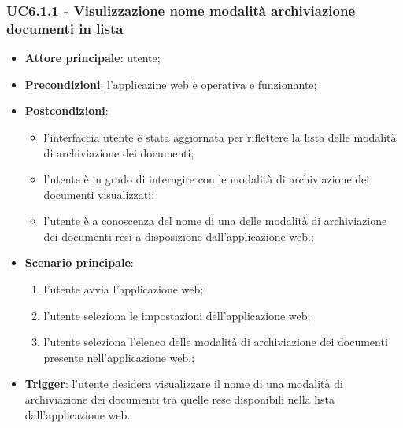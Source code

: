 \documentclass[10pt, a4paper]{article}
\begin{document}
    \subsubsection{UC6.1.1 - Visulizzazione nome modalità archiviazione documenti in lista}
    \begin{itemize}
        \item \textbf{Attore principale}: utente;
        \item \textbf{Precondizioni}: l'applicazine web è operativa e funzionante;
        \item \textbf{Postcondizioni}: 
        \begin{itemize}
            \item l'interfaccia utente è stata aggiornata per riflettere la lista delle modalità di archiviazione dei documenti;
            \item l'utente è in grado di interagire con le modalità di archiviazione dei documenti visualizzati;
            \item l'utente è a conoscenza del nome di una delle modalità di archiviazione dei documenti resi a disposizione dall'applicazione web.;
        \end{itemize}  
        \item \textbf{Scenario principale}:
            \begin{enumerate}
                \item l'utente avvia l'applicazione web;
                \item l'utente seleziona le impostazioni dell'applicazione web;
                \item l'utente seleziona l'elenco delle modalità di archiviazione dei documenti presente nell'applicazione web.;
            \end{enumerate}
        \item \textbf{Trigger}: l'utente desidera visualizzare il nome di una modalità di archiviazione dei documenti tra quelle rese disponibili nella lista dall'applicazione web.
    \end{itemize}
\end{document}
